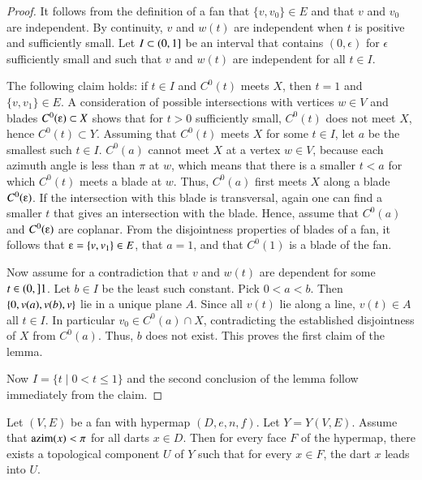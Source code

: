 \begin{proof}
It follows from the definition of a fan that $\{v,v_0\}\in E$ and
that $v$ and $v_0$ are independent.  By continuity, $v$ and $w(t)$
are independent when $t$ is positive and sufficiently small.  
Let $I\subset(0,1]$ be an interval that contains $(0,\epsilon)$ for $\epsilon$ sufficiently small and such that $v$ and $w(t)$ are independent for all $t\in I$.

The following claim holds: if $t\in I$ and $C^0(t)$ meets $X$, then $t=1$ and $\{v,v_1\}\in E$.  A consideration of possible intersections with vertices $w\in V$ and blades
$C^0(\e)\subset X$ shows that for $t>0$ sufficiently small,
$C^0(t)$ does not meet $X$, hence $C^0(t)\subset Y$.  Assuming 
that $C^0(t)$ meets $X$ for some $t\in I$, let $a$
be the smallest such $t\in I$.
$C^0(a)$ cannot meet $X$ at a vertex $w\in V$, because each azimuth angle
is less than $\pi$ at $w$, which means that 
there is a smaller $t<a$ for which $C^0(t)$ meets a blade at $w$.
Thus, $C^0(a)$ first meets $X$ along a blade $C^0(\e)$. If
the intersection with this blade is transversal, again one can find a smaller $t$ that
gives an intersection with the blade.  Hence, assume that
$C^0(a)$ and $C^0(\e)$ are coplanar.  From the disjointness
properties of blades of a fan, it follows that $\e = \{v,v_1\}\in E$,
that $a=1$, and that $C^0(1)$ is a blade of the fan.

Now assume for a contradiction that $v$ and $w(t)$ are dependent for some $t\in(0,]1$.  Let $b\in I$ be the least such constant.  
Pick $0<a<b$.  Then
$\{0,v(a),v(b),v\}$ lie in a unique plane $A$.  Since all $v(t)$
lie along a line,  $v(t)\in A$ all $t\in I$.  In particular $v_0\in C^0(a)\cap X$,
contradicting the established disjointness of $X$ from $C^0(a)$.  Thus, $b$ does not exist.  This proves the first claim of the lemma.  

Now $I= \{t\mid 0 < t \le 1\}$ and the second conclusion of the lemma follow immediately from the claim.
\end{proof}

\begin{lemma} 
Let $(V,E)$ be a fan with hypermap $(D,e,n,f)$. Let $Y=Y(V,E)$. Assume that ${\operatorname{azim}}(x)<\pi$ for all darts $x\in D$. Then for every face $F$ of the hypermap, there exists a topological component $U$ of $Y$ such that for every $x\in F$, the dart $x$ leads into $U$. 
\end{lemma}

